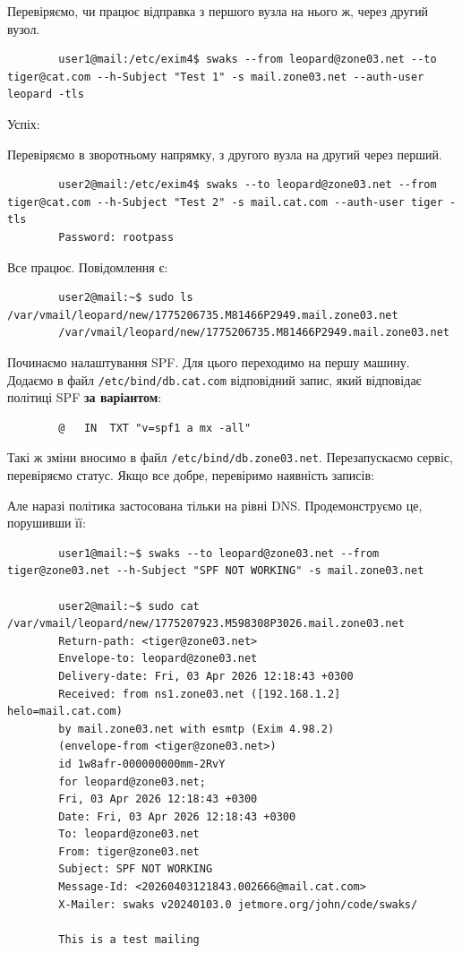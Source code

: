 \documentclass[14pt, a4paper]{extreport}
\begin{document}
	
	Перевіряємо, чи працює відправка з першого вузла на нього ж, через другий вузол.
	
	\begin{verbatim}
		user1@mail:/etc/exim4$ swaks --from leopard@zone03.net --to tiger@cat.com --h-Subject "Test 1" -s mail.zone03.net --auth-user leopard -tls
	\end{verbatim}
	
	Успіх:
	
	
	Перевіряємо в зворотньому напрямку, з другого вузла на другий через перший.
	
	\begin{verbatim}
		user2@mail:/etc/exim4$ swaks --to leopard@zone03.net --from tiger@cat.com --h-Subject "Test 2" -s mail.cat.com --auth-user tiger -tls
		Password: rootpass
	\end{verbatim}
	
	Все працює. Повідомлення є:
	
	\begin{verbatim}
		user2@mail:~$ sudo ls /var/vmail/leopard/new/1775206735.M81466P2949.mail.zone03.net
		/var/vmail/leopard/new/1775206735.M81466P2949.mail.zone03.net
	\end{verbatim}
	
	Починаємо налаштування SPF. Для цього переходимо на першу машину. Додаємо в файл \texttt{/etc/bind/db.cat.com} відповідний запис, який відповідає політиці SPF \textbf{за варіантом}:
	
	\begin{verbatim}
		@	IN	TXT	"v=spf1 a mx -all"
	\end{verbatim}
	
	Такі ж зміни вносимо в файл \texttt{/etc/bind/db.zone03.net}. Перезапускаємо сервіс, перевіряємо статус. Якщо все добре, перевіримо наявність записів:
	
	
	Але наразі політика застосована тільки на рівні DNS. Продемонструємо це, порушивши її:
	
	\begin{verbatim}
		user1@mail:~$ swaks --to leopard@zone03.net --from tiger@zone03.net --h-Subject "SPF NOT WORKING" -s mail.zone03.net
		
		user2@mail:~$ sudo cat /var/vmail/leopard/new/1775207923.M598308P3026.mail.zone03.net
		Return-path: <tiger@zone03.net>
		Envelope-to: leopard@zone03.net
		Delivery-date: Fri, 03 Apr 2026 12:18:43 +0300
		Received: from ns1.zone03.net ([192.168.1.2] helo=mail.cat.com)
		by mail.zone03.net with esmtp (Exim 4.98.2)
		(envelope-from <tiger@zone03.net>)
		id 1w8afr-000000000mm-2RvY
		for leopard@zone03.net;
		Fri, 03 Apr 2026 12:18:43 +0300
		Date: Fri, 03 Apr 2026 12:18:43 +0300
		To: leopard@zone03.net
		From: tiger@zone03.net
		Subject: SPF NOT WORKING
		Message-Id: <20260403121843.002666@mail.cat.com>
		X-Mailer: swaks v20240103.0 jetmore.org/john/code/swaks/
		
		This is a test mailing
	\end{verbatim}
	
\end{document}
